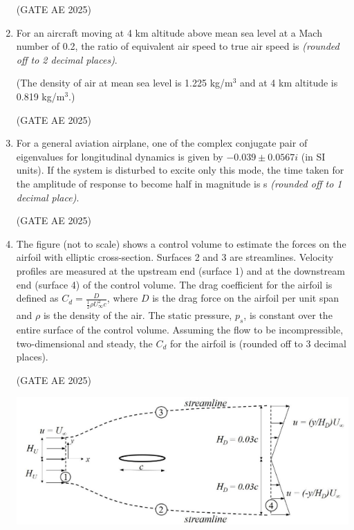 \documentclass[journal,12pt,onecolumn]{IEEEtran}
\theoremstyle{remark}
\begin{document}
\begin{flushleft}
\begin{enumerate}
\hfill (GATE AE 2025)

\item For an aircraft moving at 4 km altitude above mean sea level at a Mach number of 0.2, the ratio of equivalent air speed to true air speed is \underline{\hspace{3cm}} \textit{(rounded off to 2 decimal places)}.  

(The density of air at mean sea level is 1.225 kg/m$^3$ and at 4 km altitude is 0.819 kg/m$^3$.)

\hfill (GATE AE 2025)

\item For a general aviation airplane, one of the complex conjugate pair of eigenvalues for longitudinal dynamics is given by $-0.039 \pm 0.0567 i$ (in SI units). If the system is disturbed to excite only this mode, the time taken for the amplitude of response to become half in magnitude is \underline{\hspace{3cm}} s \textit{(rounded off to 1 decimal place)}.

\hfill (GATE AE 2025)

\item The figure (not to scale) shows a control volume to estimate the forces on the airfoil with elliptic cross-section. Surfaces 2 and 3 are streamlines. Velocity profiles are measured at the upstream end (surface 1) and at the downstream end (surface 4) of the control volume. The drag coefficient for the airfoil is defined as
$C_d = \frac{D}{\frac12 \rho U_\infty^2 c}$,
where $D$ is the drag force on the airfoil per unit span and $\rho$ is the density of the air. The static pressure, $p_s$, is constant over the entire surface of the control volume. Assuming the flow to be incompressible, two-dimensional and steady, the $C_d$ for the airfoil is \underline{\hspace{3cm}} (rounded off to 3 decimal places). 

\hfill (GATE AE 2025)

\begin{center}
\includegraphics[width=0.8\columnwidth]{figs/63.png}
\end{center}


\end{enumerate}
\end{flushleft}
\end{document}
